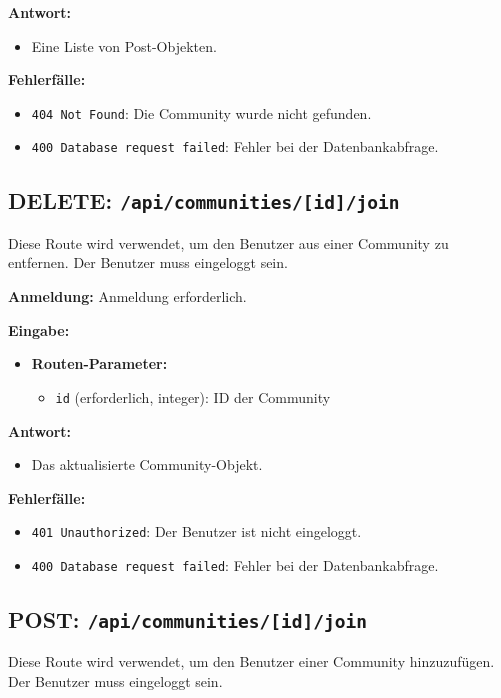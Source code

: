 \documentclass[a4paper,12pt]{article}
\begin{document}
\textbf{Antwort:}
\begin{itemize}
    \item Eine Liste von Post-Objekten.
\end{itemize}

\textbf{Fehlerfälle:}
\begin{itemize}
    \item \texttt{404 Not Found}:
        Die Community wurde nicht gefunden.
    \item \texttt{400 Database request failed}:
        Fehler bei der Datenbankabfrage.
\end{itemize}

\subsection{DELETE: \texttt{/api/communities/[id]/join}}

Diese Route wird verwendet, um den Benutzer aus einer Community zu entfernen.
Der Benutzer muss eingeloggt sein.

\textbf{Anmeldung:} Anmeldung erforderlich.

\textbf{Eingabe:}
\begin{itemize}
    \item \textbf{Routen-Parameter:}
    \begin{itemize}
        \item \texttt{id} (erforderlich, integer):
            ID der Community
    \end{itemize}
\end{itemize}

\textbf{Antwort:}
\begin{itemize}
    \item Das aktualisierte Community-Objekt.
\end{itemize}

\textbf{Fehlerfälle:}
\begin{itemize}
    \item \texttt{401 Unauthorized}:
        Der Benutzer ist nicht eingeloggt.
    \item \texttt{400 Database request failed}:
        Fehler bei der Datenbankabfrage.
\end{itemize}

\subsection{POST: \texttt{/api/communities/[id]/join}}

Diese Route wird verwendet, um den Benutzer einer Community hinzuzufügen. Der
Benutzer muss eingeloggt sein.
\end{document}
